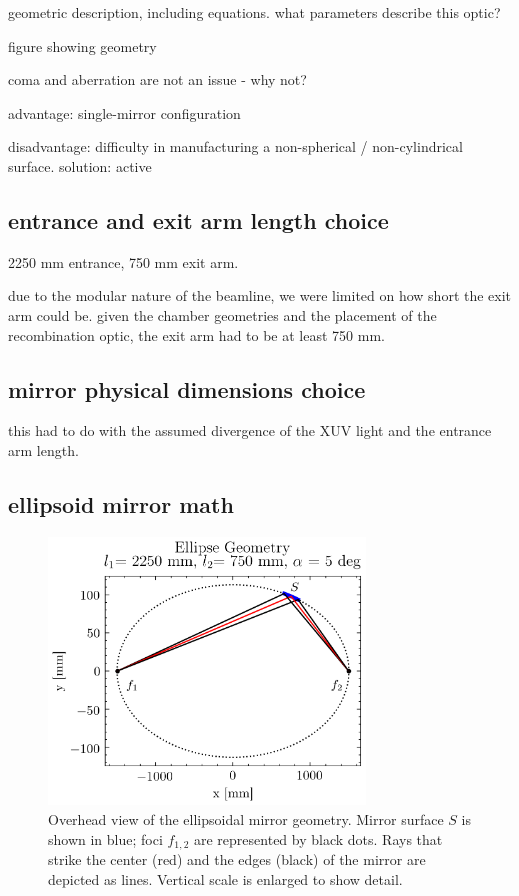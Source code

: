 geometric description, including equations. what parameters describe this optic?

figure showing geometry

coma and aberration are not an issue - why not?

advantage: single-mirror configuration

disadvantage: difficulty in manufacturing a non-spherical / non-cylindrical surface. solution: active


\subsection{entrance and exit arm length choice}
2250 mm entrance, 750 mm exit arm.

due to the modular nature of the beamline, we were limited on how short the exit arm could be. given the chamber geometries and the placement of the recombination optic, the exit arm had to be at least 750 mm. 

\subsection{mirror physical dimensions choice}
this had to do with the assumed divergence of the XUV light and the entrance arm length.

\subsection{ellipsoid mirror math}
\begin{figure}
	\centering
	\includegraphics[width=0.75\textwidth]{figures/chap2/EM_2D.png}
	\caption{Overhead view of the ellipsoidal mirror geometry. Mirror surface $S$ is shown in blue; foci $f_{1,2}$ are represented by black dots. Rays that strike the center (red) and the edges (black) of the mirror are depicted as lines. Vertical scale is enlarged to show detail.}
	\label{fig:EM_2D}
\end{figure}

